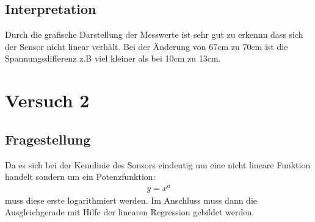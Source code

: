 \documentclass[12pt, oneside, a4paper, \docLanguage]{report}
\begin{document}
\section{Interpretation}
\label{chap:VERSUCH_1_INTERPRETATION}
\begin{normalsize}
Durch die grafische Darstellung der Messwerte ist sehr gut zu erkennn dass sich der Sensor nicht linear verhält. Bei der Änderung von 67cm zu 70cm ist die Spannungsdifferenz z.B viel kleiner als bei 10cm zu 13cm.
\end{normalsize}

%
%
\chapter{Versuch 2}
\label{chap:VERSUCH_2}

\section{Fragestellung}
\label{chap:VERSUCH_2_FRAGESTELLUNG}
\begin{normalsize}
Da es sich bei der Kennlinie des Sonsors eindeutig um eine nicht lineare Funktion handelt sondern um ein Potenzfunktion:
\begin{align*}
y=x^a
\end{align*}
muss diese erste logarithmiert werden.
Im Anschluss muss dann die Ausgleichgerade mit Hilfe der linearen Regression gebildet werden.
\end{normalsize}
\pagebreak
\end{document}
